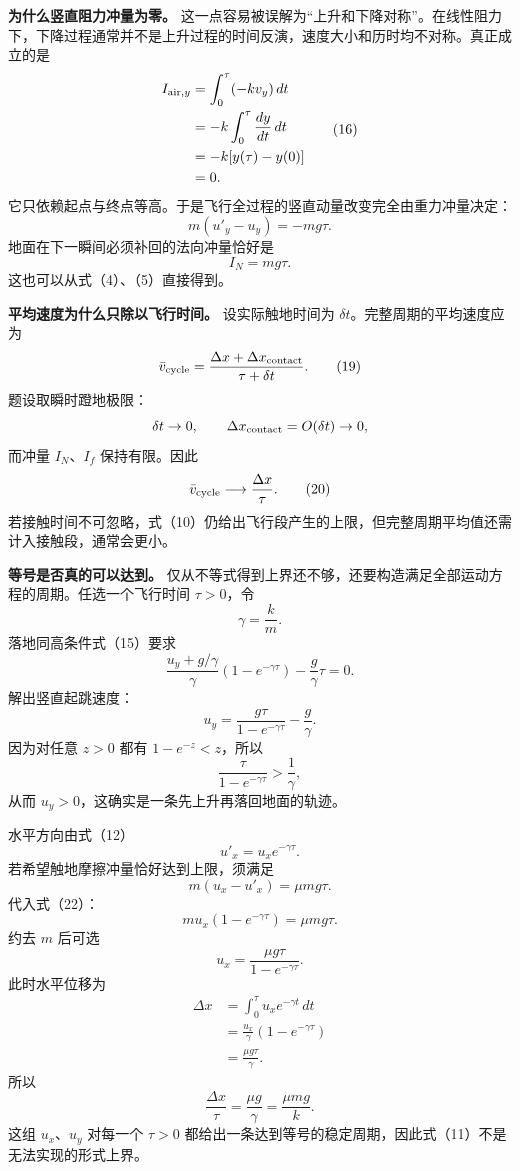 \documentclass[12pt,a4paper,UTF8]{ctexart}
\begin{document}
\textbf{为什么竖直阻力冲量为零。}
这一点容易被误解为``上升和下降对称''。在线性阻力下，下降过程通常并不是上升过程的时间反演，速度大小和历时均不对称。真正成立的是
\[
\begin{aligned}
I_{{\rm air},y}
&=\int_0^\tau(-kv_y)\,dt\\
&=-k\int_0^\tau\frac{dy}{dt}\,dt\\
&=-k[y(\tau)-y(0)]\\
&=0.
\end{aligned} \tag{16}
\]
它只依赖起点与终点等高。于是飞行全过程的竖直动量改变完全由重力冲量决定：
\[
m(u'_y-u_y)=-mg\tau. \tag{17}
\] 地面在下一瞬间必须补回的法向冲量恰好是 \[
I_N=mg\tau. \tag{18}
\] 这也可以从式（4）、（5）直接得到。

\textbf{平均速度为什么只除以飞行时间。} 设实际触地时间为
\(\delta t\)。完整周期的平均速度应为 \[
\bar v_{\rm cycle}
=\frac{\Delta x+\Delta x_{\rm contact}}{\tau+\delta t}. \tag{19}
\] 题设取瞬时蹬地极限： \[
\delta t\to0,
\qquad
\Delta x_{\rm contact}=O(\delta t)\to0,
\] 而冲量 \(I_N\)、\(I_f\) 保持有限。因此 \[
\bar v_{\rm cycle}\longrightarrow\frac{\Delta x}{\tau}. \tag{20}
\]
若接触时间不可忽略，式（10）仍给出飞行段产生的上限，但完整周期平均值还需计入接触段，通常会更小。

\textbf{等号是否真的可以达到。}
仅从不等式得到上界还不够，还要构造满足全部运动方程的周期。任选一个飞行时间
\(\tau>0\)，令 \[
\gamma=\frac{k}{m}.
\] 落地同高条件式（15）要求 \[
\frac{u_y+g/\gamma}{\gamma}
(1-e^{-\gamma\tau})
-\frac g\gamma\tau=0.
\] 解出竖直起跳速度： \[
\boxed{
u_y
=\frac{g\tau}{1-e^{-\gamma\tau}}
-\frac g\gamma
}. \tag{21}
\] 因为对任意 \(z>0\) 都有 \(1-e^{-z}<z\)，所以 \[
\frac{\tau}{1-e^{-\gamma\tau}}>\frac1\gamma,
\] 从而 \(u_y>0\)，这确实是一条先上升再落回地面的轨迹。

水平方向由式（12） \[
u'_x=u_xe^{-\gamma\tau}. \tag{22}
\] 若希望触地摩擦冲量恰好达到上限，须满足 \[
m(u_x-u'_x)=\mu mg\tau. \tag{23}
\] 代入式（22）： \[
m u_x(1-e^{-\gamma\tau})=\mu mg\tau.
\] 约去 \(m\) 后可选 \[
\boxed{
u_x=\frac{\mu g\tau}{1-e^{-\gamma\tau}}
}. \tag{24}
\] 此时水平位移为 \[
\begin{aligned}
\Delta x
&=\int_0^\tau u_xe^{-\gamma t}\,dt\\
&=\frac{u_x}{\gamma}
(1-e^{-\gamma\tau})\\
&=\frac{\mu g\tau}{\gamma}.
\end{aligned} \tag{25}
\] 所以 \[
\frac{\Delta x}{\tau}
=\frac{\mu g}{\gamma}
=\frac{\mu mg}{k}. \tag{26}
\] 这组 \(u_x\)、\(u_y\) 对每一个 \(\tau>0\)
都给出一条达到等号的稳定周期，因此式（11）不是无法实现的形式上界。
\end{document}
